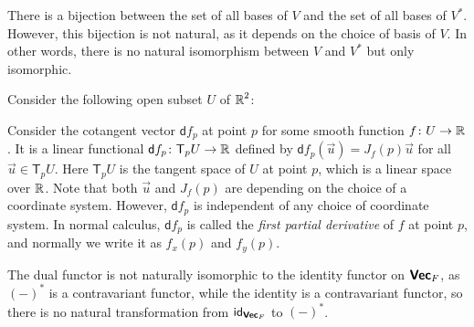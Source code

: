 \begin{remark}
  There is a bijection between the set of all bases of $V$ and the set of all bases of $V^*$. However, this bijection is not natural, as it depends on the choice of basis of $V$. In other words, there is no natural isomorphism between $V$ and $V^*$ but only isomorphic.
\end{remark}

\begin{example}
  Consider the following open subset $U$ of $\operatorname{\mathbb{R}}^2$:
  \begin{center}
  \end{center}
  Consider the cotangent vector $\mathsf{d}f_p$ at point $p$ for some smooth function $f \colon U \to \operatorname{\mathbb{R}}$. It is a linear functional $\text{\normalfont\sffamily d}f_p \colon \text{\normalfont\sffamily T}_p U \to \operatorname{\mathbb{R}}$ defined by $\mathsf{d}f_p(\vec{u}) = J_f(p) \vec{u}$ for all $\vec{u} \in \mathsf{T}_p U$. Here $\mathsf{T}_p U$ is the tangent space of $U$ at point $p$, which is a linear space over $\operatorname{\mathbb{R}}$. Note that both $\vec{u}$ and $J_f(p)$ are depending on the choice of a coordinate system. However, $\mathsf{d}f_p$ is independent of any choice of coordinate system. In normal calculus, $\mathsf{d}f_p$ is called the \emph{first partial derivative} of $f$ at point $p$, and normally we write it as $f_x(p)$ and $f_y(p)$.
\end{example}

The dual functor is not naturally isomorphic to the identity functor on $\operatorname{\text{\normalfont\bf\sffamily Vec}}_F$, as ${(-)}^*$ is a contravariant functor, while the identity is a contravariant functor, so there is no natural transformation from $\operatorname{\text{\normalfont\sffamily id}}_{\operatorname{\text{\normalfont\bf\sffamily Vec}}_F}$ to ${(-)}^*$.

